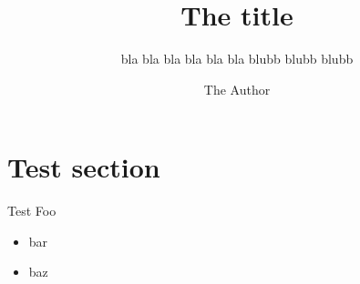 \documentclass[aspectratio=169]{beamer}
\title{The title}
\subtitle{bla bla bla bla bla bla blubb blubb blubb}
\author{The Author}
\institute{University of Gothenburg}
\begin{document}
\begin{frame}
  \maketitle
\end{frame}
\section{Test section}
\begin{frame}{Test}
  Foo
  \begin{itemize}
  \item bar
  \item baz
  \end{itemize}
\end{frame}

\begin{frame}
  \makefinal

  
\end{frame}
  
\end{document}

